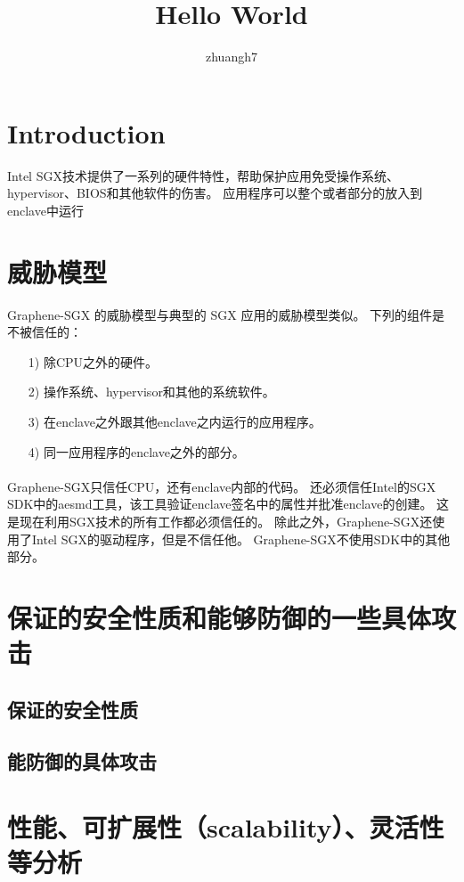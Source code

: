 \documentclass{article}
\author{zhuangh7}
\title{Hello World}
\begin{document}
\maketitle
\section{Introduction}
Intel SGX技术提供了一系列的硬件特性，帮助保护应用免受操作系统、hypervisor、BIOS和其他软件的伤害。
应用程序可以整个或者部分的放入到enclave中运行
\section{威胁模型}
Graphene-SGX 的威胁模型与典型的 SGX 应用的威胁模型类似。
下列的组件是不被信任的：
\begin{itemize}
    \item [1)] 
    除CPU之外的硬件。
    \item [2)]
    操作系统、hypervisor和其他的系统软件。
    \item [3)]
    在enclave之外跟其他enclave之内运行的应用程序。
    \item [4)]
    同一应用程序的enclave之外的部分。
\end{itemize}   
\paragraph{}
Graphene-SGX只信任CPU，还有enclave内部的代码。
还必须信任Intel的SGX SDK中的aesmd工具，该工具验证enclave签名中的属性并批准enclave的创建。
这是现在利用SGX技术的所有工作都必须信任的。
除此之外，Graphene-SGX还使用了Intel SGX的驱动程序，但是不信任他。
Graphene-SGX不使用SDK中的其他部分。


\section{保证的安全性质和能够防御的一些具体攻击}


\subsection{保证的安全性质}


\subsection{能防御的具体攻击}


\section{性能、可扩展性（scalability）、灵活性等分析}
\end{document}
